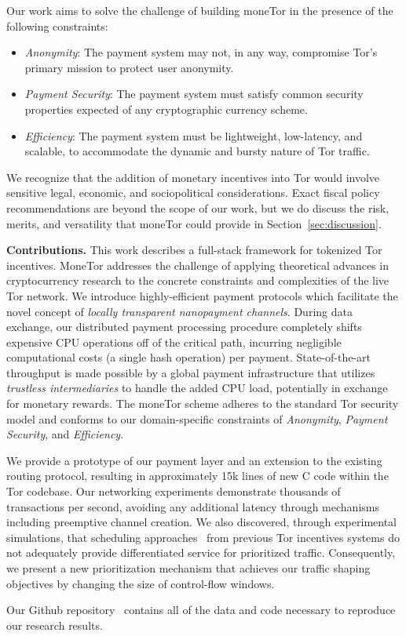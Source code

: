 Our work aims to solve the challenge of building moneTor in the presence of the following constraints:

\begin{itemize}

\item \emph{Anonymity}: The payment system may not, in any way, compromise Tor's primary mission to protect user anonymity.

\item \emph{Payment Security}: The payment system must satisfy common security properties expected of any cryptographic currency scheme.

\item \emph{Efficiency}: The payment system must be lightweight, low-latency, and scalable, to accommodate the
dynamic and bursty nature of Tor traffic.


\end{itemize}

We recognize that the addition of monetary incentives into Tor would involve sensitive legal, economic, and sociopolitical considerations.
Exact fiscal policy recommendations are beyond the scope of our work, but we do discuss the risk, merits, and versatility that moneTor could provide in Section~\ref{sec:discussion}.

\label{sec:Contributions} \medskip \noindent \textbf{Contributions.}
This work describes a full-stack framework for tokenized Tor incentives.
MoneTor addresses the challenge of applying theoretical advances in cryptocurrency research to the concrete constraints and complexities of the live Tor network.
We introduce highly-efficient payment protocols which facilitate the novel concept of \emph{locally transparent nanopayment channels}.
During data exchange, our distributed payment processing procedure completely shifts expensive CPU operations off of the critical path, incurring negligible computational costs (a single hash operation) per payment.
State-of-the-art throughput is made possible by a global payment infrastructure that utilizes \emph{trustless intermediaries} to handle the added CPU load, potentially in exchange for monetary rewards.
The moneTor scheme adheres to the standard Tor security model and conforms to our domain-specific constraints of \emph{Anonymity}, \emph{Payment Security}, and \emph{Efficiency}.

We provide a prototype of our payment layer and an extension to the existing routing protocol, resulting in approximately 15k lines of new C code within the Tor codebase.
Our networking experiments demonstrate thousands of transactions per second, avoiding any additional latency through mechanisms including preemptive channel creation.
We also discovered, through experimental simulations, that scheduling approaches~\cite{dovrolis1999case, tang2010improved} from previous Tor incentives systems do not adequately provide differentiated service for prioritized traffic.
Consequently, we present a new prioritization mechanism that achieves our traffic shaping objectives by changing the size of control-flow windows.

Our Github repository~\cite{monetor-github} contains all of the data and code necessary to reproduce our research results.

